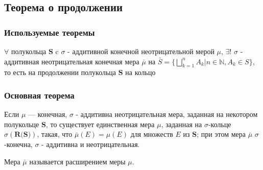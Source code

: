 \newpage

\subsection{Теорема о продолжении}

\subsubsection{Используемые теоремы}

\begin{theorem}
\cite{ShamarovDRP}
\label{intro}
$\forall$ полукольца $\textbf{S}$ c $\sigma$ - аддитивной конечной неотрицательной мерой $\mu$, $\exists$! $\sigma$ - аддитивная неотрицательная конечная мера $\bar{\mu}$ на $\bar{S} = \{\bigsqcup_{k = 1}^{n}A_k | n \in \mathds{N}, A_k \in S\}$, то есть на продолжении полукольца $\textbf{S}$ на кольцо
\end{theorem}

\subsubsection{Основная теорема}

\begin{theorem}
Если $\mu$ — конечная, $\sigma$ - аддитивна неотрицательная мера, заданная на некотором полукольце $\textbf{S}$, то существует единственная мера $\mu$, заданная на $\sigma$-кольце $\sigma(\textbf{R(S)})$, такая, что $\bar{\mu}(E) = \mu(E)$ для множеств $E$ из $\textbf{S}$; при этом мера $\bar{\mu}$ $\sigma$-конечна, $\sigma$ - аддитивна и неотрицательная. 
\end{theorem}

Мера $\bar{\mu}$ называется расширением меры $\mu$. 


